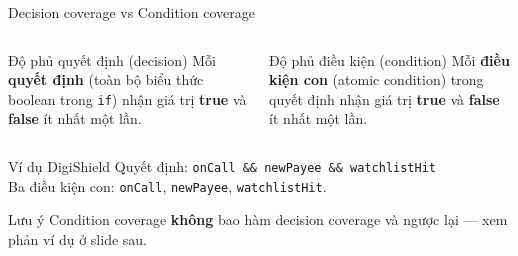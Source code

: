 \documentclass[aspectratio=169,12pt]{beamer}
\begin{document}
\begin{frame}{Decision coverage vs Condition coverage}
  \begin{columns}[T]
    \begin{block}{Độ phủ quyết định (decision)}
      Mỗi \textbf{quyết định} (toàn bộ biểu thức boolean trong
      \texttt{if}) nhận giá trị \textbf{true} và \textbf{false}
      ít nhất một lần.
    \end{block}

    \begin{block}{Độ phủ điều kiện (condition)}
      Mỗi \textbf{điều kiện con} (atomic condition) trong quyết định
      nhận giá trị \textbf{true} và \textbf{false} ít nhất một lần.
    \end{block}
  \end{columns}

  \vspace{0.4em}
  \begin{exampleblock}{Ví dụ DigiShield}
    Quyết định: \texttt{onCall \&\& newPayee \&\& watchlistHit}\\
    Ba điều kiện con: \texttt{onCall}, \texttt{newPayee},
    \texttt{watchlistHit}.
  \end{exampleblock}

  \begin{alertblock}{Lưu ý}
    Condition coverage \textbf{không} bao hàm decision coverage
    và ngược lại --- xem phản ví dụ ở slide sau.
  \end{alertblock}
\end{frame}
\end{document}
